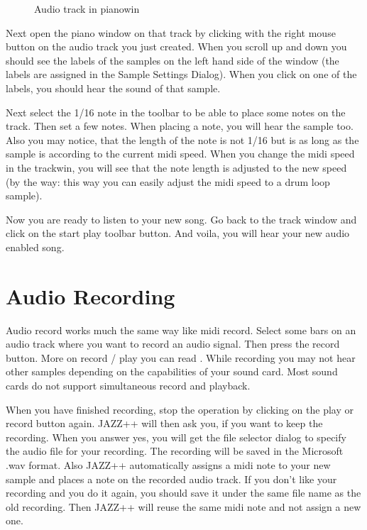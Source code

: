\documentclass[letterpaper]{report}
\begin{document}
\begin{figure}%
%
%
\caption{Audio track in pianowin}%
\end{figure}

Next open the piano window on that track by clicking with the right
mouse button on the audio track you just created. When you scroll up
and down you should see the labels of the samples on the left hand side
of the window (the labels are assigned in the Sample Settings Dialog).
When you click on one of the labels, you should hear the sound of
that sample.

Next select the 1/16 note in the toolbar to be able to place some notes
on the track. Then set a few notes. When placing a note, you will hear
the sample too. Also you may notice, that the length of the note is
not 1/16 but is as long as the sample is according to the current midi
speed. When you change the midi speed in the trackwin, you will see that
the note length is adjusted to the new speed (by the way: this way you
can easily adjust the midi speed to a drum loop sample).

Now you are ready to listen to your new song. Go back to the track
window and click on the start play toolbar button. And voila, you will
hear your new audio enabled song.


\section{Audio Recording}

Audio record works much the same way like midi record. Select some bars
on an audio track where you want to record an audio signal. Then press
the record button. More on record / play you can read
.  While recording you may not hear other samples
depending on the capabilities of your sound card. Most sound cards do not
support simultaneous record and playback.

When you have finished recording, stop the operation by clicking on the
play or record button again. JAZZ++ will then ask you, if you want to
keep the recording.  When you answer yes, you will get the file selector
dialog to specify the audio file for your recording. The recording will
be saved in the Microsoft .wav format.  Also JAZZ++ automatically assigns
a midi note to your new sample and places a note on the recorded audio
track.  If you don't like your recording and you do it again, you should
save it under the same file name as the old recording. Then JAZZ++ will
reuse the same midi note and not assign a new one.
\end{document}
